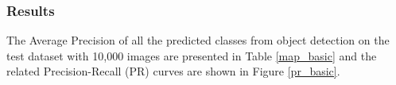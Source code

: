     \subsubsection{Results}
    The Average Precision of all the predicted classes from object detection on the test dataset with 10,000 images are presented in Table \ref{map_basic} and the related Precision-Recall (PR) curves are shown in Figure \ref{pr_basic}.
    
    \begin{table}[]
    \renewcommand{\arraystretch}{1.5}
    \caption{Average Precision values of each class in BDD100K dataset using SSD300 model with and without tuned prior boxes}
        \label{map_basic}
    \end{table}
    
